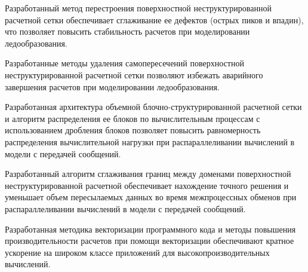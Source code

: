 \item Разработанный метод перестроения поверхностной неструктурированной расчетной сетки обеспечивает сглаживание ее дефектов (острых пиков и впадин), что позволяет повысить стабильность расчетов при моделировании ледообразования.
\item Разработанные методы удаления самопересечений поверхностной не\-структурированной расчетной сетки позволяют избежать аварийного завершения расчетов при моделировании ледообразования.
\item Разработанная архитектура объемной блочно-структурированной расчетной сетки и алгоритм распределения ее блоков по вычислительным процессам с использованием дробления блоков позволяет повысить равномерность распределения вычислительной нагрузки при распараллеливании вычислений в модели с передачей сообщений.
\item Разработанный алгоритм сглаживания границ между доменами поверхностной неструктурированной расчетной обеспечивает нахождение точного решения и уменьшает объем пересылаемых данных во время межпроцессных обменов при распараллеливании вычислений в модели с передачей сообщений.
\item Разработанная методика векторизации программного кода и методы повышения производительности расчетов при помощи векторизации обеспечивают кратное ускорение на широком классе приложений для высокопроизводительных вычислений.